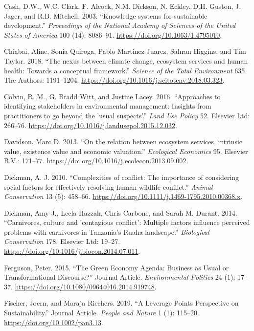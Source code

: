 \documentclass[fleqn,10pt]{wlpeerj} %
\begin{document}
\leavevmode\hypertarget{ref-Cash2003}{}%
Cash, D.W., W.C. Clark, F. Alcock, N.M. Dickson, N. Eckley, D.H. Guston,
J. Jager, and R.B. Mitchell. 2003. ``Knowledge systems for sustainable
development.'' \emph{Proceedings of the National Academy of Sciences of
the United States of America} 100 (14): 8086--91.
\url{https://doi.org/10.1063/1.4795010}.

\leavevmode\hypertarget{ref-Chiabai2018}{}%
Chiabai, Aline, Sonia Quiroga, Pablo Martinez-Juarez, Sahran Higgins,
and Tim Taylor. 2018. ``The nexus between climate change, ecosystem
services and human health: Towards a conceptual framework.''
\emph{Science of the Total Environment} 635. The Authors: 1191--1204.
\url{https://doi.org/10.1016/j.scitotenv.2018.03.323}.

\leavevmode\hypertarget{ref-Colvin2016}{}%
Colvin, R. M., G. Bradd Witt, and Justine Lacey. 2016. ``Approaches to
identifying stakeholders in environmental management: Insights from
practitioners to go beyond the 'usual suspects'.'' \emph{Land Use
Policy} 52. Elsevier Ltd: 266--76.
\url{https://doi.org/10.1016/j.landusepol.2015.12.032}.

\leavevmode\hypertarget{ref-Davidson2013}{}%
Davidson, Marc D. 2013. ``On the relation between ecosystem services,
intrinsic value, existence value and economic valuation.''
\emph{Ecological Economics} 95. Elsevier B.V.: 171--77.
\url{https://doi.org/10.1016/j.ecolecon.2013.09.002}.

\leavevmode\hypertarget{ref-Dickman2010}{}%
Dickman, A. J. 2010. ``Complexities of conflict: The importance of
considering social factors for effectively resolving human-wildlife
conflict.'' \emph{Animal Conservation} 13 (5): 458--66.
\url{https://doi.org/10.1111/j.1469-1795.2010.00368.x}.

\leavevmode\hypertarget{ref-Dickman2014}{}%
Dickman, Amy J., Leela Hazzah, Chris Carbone, and Sarah M. Durant. 2014.
``Carnivores, culture and 'contagious conflict': Multiple factors
influence perceived problems with carnivores in Tanzania's Ruaha
landscape.'' \emph{Biological Conservation} 178. Elsevier Ltd: 19--27.
\url{https://doi.org/10.1016/j.biocon.2014.07.011}.

\leavevmode\hypertarget{ref-Ferguson2015}{}%
Ferguson, Peter. 2015. ``The Green Economy Agenda: Business as Usual or
Transformational Discourse?'' Journal Article. \emph{Environmental
Politics} 24 (1): 17--37.
\url{https://doi.org/10.1080/09644016.2014.919748}.

\leavevmode\hypertarget{ref-Fischer2019}{}%
Fischer, Joern, and Maraja Riechers. 2019. ``A Leverage Points
Perspective on Sustainability.'' Journal Article. \emph{People and
Nature} 1 (1): 115--20. \url{https://doi.org/10.1002/pan3.13}.
\end{document}
